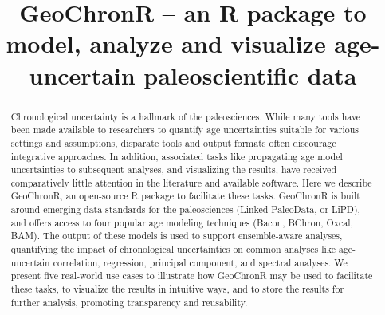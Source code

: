 \documentclass[gchron, manuscript]{copernicus}
\begin{document}
\title{GeoChronR -- an R package to model, analyze and visualize age-uncertain paleoscientific data}














\received{}
\pubdiscuss{} %
\revised{}
\accepted{}
\published{}




\maketitle


\begin{abstract}
Chronological uncertainty is a hallmark of the paleosciences. While many tools have been made available to researchers to quantify age uncertainties suitable for various settings and assumptions, disparate tools and output formats often discourage integrative approaches. In addition, associated tasks like propagating age model uncertainties to subsequent analyses, and visualizing the results, have received comparatively little attention in the literature and available software. Here we describe GeoChronR, an open-source R package to facilitate these tasks. GeoChronR is built around emerging data standards for the paleosciences (Linked PaleoData, or LiPD), and offers access to four popular age modeling techniques (Bacon, BChron, Oxcal, BAM). The output of these models is used to support ensemble-aware analyses, quantifying the impact of chronological uncertainties on common analyses like age-uncertain correlation, regression, principal component, and spectral analyses. We present five real-world use cases to illustrate how GeoChronR may be used to facilitate these tasks, to visualize the results in intuitive ways, and to store the results for further analysis, promoting transparency and reusability.
\end{abstract}
\end{document}
